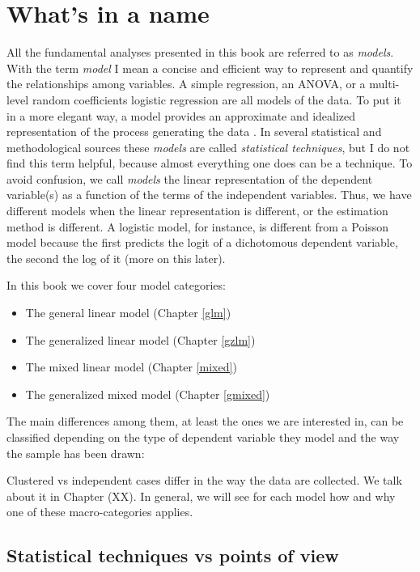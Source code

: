 \documentclass[
]{book}
\providecommand{\tightlist}{%
  \setlength{\itemsep}{0pt}\setlength{\parskip}{0pt}}
\begin{document}
\hypertarget{naming}{%
\section{What's in a name}\label{naming}}

All the fundamental analyses presented in this book are referred to as \emph{models}. With the term \emph{model} I mean a concise and efficient way to represent and quantify the relationships among variables. A simple regression, an ANOVA, or a multi-level random coefficients logistic regression are all models of the data. To put it in a more elegant way, a model provides an approximate and idealized representation of the process generating the data \citep{neyman1957inductive}. In several statistical and methodological sources these \emph{models} are called \emph{statistical techniques}, but I do not find this term helpful, because almost everything one does can be a technique. To avoid confusion, we call \emph{models} the linear representation of the dependent variable(s) as a function of the terms of the independent variables. Thus, we have different models when the linear representation is different, or the estimation method is different. A logistic model, for instance, is different from a Poisson model because the first predicts the logit of a dichotomous dependent variable, the second the log of it (more on this later).

In this book we cover four model categories:

\begin{itemize}
\tightlist
\item
  The general linear model (Chapter \ref{glm})
\item
  The generalized linear model (Chapter \ref{gzlm})
\item
  The mixed linear model (Chapter \ref{mixed})
\item
  The generalized mixed model (Chapter \ref{gmixed})
\end{itemize}

The main differences among them, at least the ones we are interested in, can be classified depending on the type of dependent variable they model and the way the sample has been drawn:

Clustered vs independent cases differ in the way the data are collected. We talk about it in Chapter (XX). In general, we will see for each model how and why one of these macro-categories applies.

\hypertarget{angles}{%
\subsection{Statistical techniques vs points of view}\label{angles}}
\end{document}

